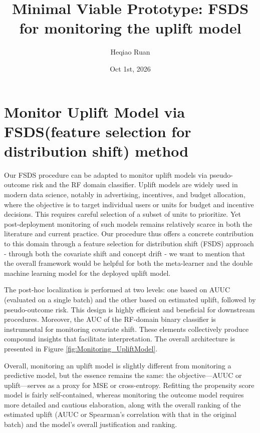 \documentclass{article}
\title{Minimal Viable Prototype: FSDS for monitoring the uplift model}
\author{Heqiao Ruan}
\date{Oct 1st, 2026}
\begin{document}
\maketitle

\section{Monitor Uplift Model via \textbf{FSDS}(feature selection for distribution shift) method}
\par Our FSDS procedure can be adapted to monitor uplift models via pseudo-outcome risk and the RF domain classifier. Uplift models are widely used in modern data science, notably in advertising, incentives, and budget allocation, where the objective is to target individual users or units for budget and incentive decisions. This requires careful selection of a subset of units to prioritize. Yet post-deployment monitoring of such models remains relatively scarce in both the literature and current practice. Our procedure thus offers a concrete contribution to this domain through a feature selection for distribution shift (FSDS) approach - through both the covariate shift and concept drift - we want to mention that the overall framework would be helpful for both the meta-learner and the double machine learning model for the deployed uplift model.\\

\par The post-hoc localization is performed at two levels: one based on AUUC (evaluated on a single batch) and the other based on estimated uplift, followed by pseudo-outcome risk. This design is highly efficient and beneficial for downstream procedures. Moreover, the AUC of the RF-domain binary classifier is instrumental for monitoring covariate shift. These elements collectively produce compound insights that facilitate interpretation. The overall architecture is presented in Figure \ref{fig:Monitoring_UpliftModel}. \\
\par Overall, monitoring an uplift model is slightly different from monitoring a predictive model, but the essence remains the same: the objective---AUUC or uplift---serves as a proxy for MSE or cross-entropy. Refitting the propensity score model is fairly self-contained, whereas monitoring the outcome model requires more detailed and cautious elaboration, along with the overall ranking of the estimated uplift (AUUC or Spearman's correlation with that in the original batch) and the model's overall justification and ranking.
\end{document}
